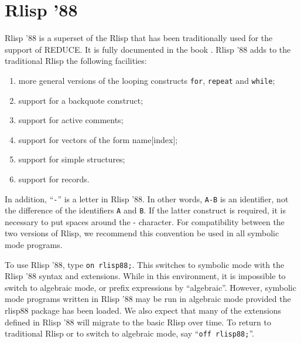 \section{Rlisp '88}

Rlisp '88 is a superset of the Rlisp that has been traditionally used for
the support of REDUCE.  It is fully documented in the book \cite{Marti:93a}.
Rlisp '88 adds to the traditional Rlisp the following facilities:
\begin{enumerate}
\item more general versions of the looping constructs \texttt{for},
\texttt{repeat} and \texttt{while};

\item support for a backquote construct;

\item support for active comments;

\item support for vectors of the form name[index];

\item support for simple structures;

\item support for records.
\end{enumerate}

In addition, ``\texttt{-}'' is a letter in Rlisp '88.  In other words, \texttt{A-B} is an
identifier, not the difference of the identifiers \texttt{A} and \texttt{B}.  If
the latter construct is required, it is necessary to put spaces around the
- character.  For compatibility between the two versions of Rlisp, we
recommend this convention be used in all symbolic mode programs.

\hypertarget{switch:RLISP88}{}
To use Rlisp '88, type \texttt{on rlisp88;}.  This switches to
symbolic mode with the Rlisp '88 syntax and extensions.  While in this
environment, it is impossible to switch to algebraic mode, or prefix
expressions by ``algebraic''.  However, symbolic mode programs written in
Rlisp '88 may be run in algebraic mode provided the rlisp88 package has been
loaded.  We also expect that many of the extensions defined in Rlisp '88
will migrate to the basic Rlisp over time.  To return to traditional Rlisp
or to switch to algebraic mode, say ``\texttt{off rlisp88;}''.

